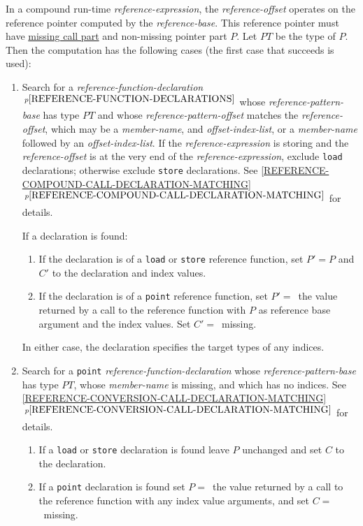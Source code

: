 \documentclass[12pt]{article}
\newcommand{\itemref}[1]{\ref{#1}$\,^{p\pageref{#1}}$}
\newcommand{\pagnote}[1]{$\,^{p\pageref{#1}}$}
\begin{document}
In a compound run-time {\em reference-expression}, the
{\em reference-offset} operates on the reference pointer
computed by the {\em reference-base}.  This reference pointer
must have \underline{missing call part} and non-missing pointer part $P$.
Let $PT$ be the type of $P$.
Then the computation has
the following cases (the first case that
succeeds is used):\label{RUN-TIME-FIELD-SELECTION}
\begin{enumerate}[resume]

\item\label{RUN-TIME-REFERENCE-COMPOUND-CASE}
Search for a {\em reference-function-declaration}%
\pagnote{REFERENCE-FUNCTION-DECLARATIONS} whose {\em reference-pattern-base}
has type $PT$ and whose {\em reference-pattern-offset} matches
the {\em reference-offset}, which may be a {\em member-name},
and {\em offset-index-list}, or a {\em member-name} followed by an
{\em offset-index-list}.
If the {\em reference-expression} is storing
and the {\em reference-offset} is at the very end of the
{\em reference-expression}, exclude {\tt load} declarations;
otherwise exclude {\tt store} declarations.
See
\itemref{REFERENCE-COMPOUND-CALL-DECLARATION-MATCHING} for details.

If a declaration is found:
\begin{enumerate}
\item If the declaration is of a {\tt load} or {\tt store} reference function,
set $P' = P$ and $C'$ to the declaration and index values.
\item If the declaration is of a {\tt point} reference function,
set $P'=$~the value returned by a call to the reference function
with $P$ as reference base argument and the index values.  Set $C'=$~missing.
\end{enumerate}
In either case, the declaration specifies the target types of any indices.

\item\label{RUN-TIME-REFERENCE-CONVERSION-CASE}
Search for a {\tt point} {\em reference-function-declaration}
whose {\em reference-pattern-base} has type $PT$, whose
{\em mem\-ber-name} is missing, and which has no indices.
See
\itemref{REFERENCE-CONVERSION-CALL-DECLARATION-MATCHING} for details.

\begin{enumerate}
\item If a {\tt load} or {\tt store} declaration is found
leave $P$ unchanged and set $C$ to the declaration.
\item If a {\tt point} declaration is found
set $P=$~the value returned by a call to the reference function
with any index value arguments, and set $C=$~missing.


\end{enumerate}
\end{enumerate}
\end{document}

